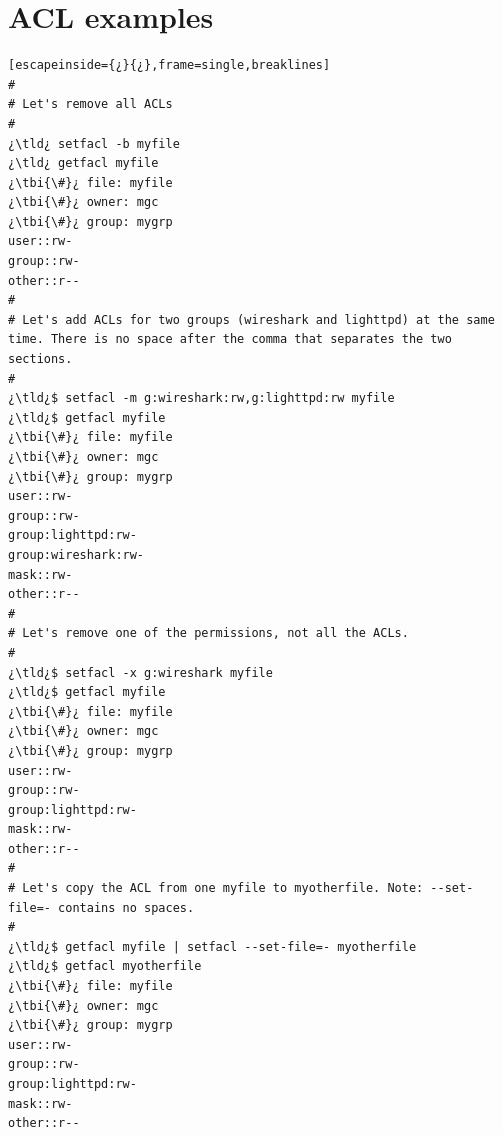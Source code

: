 \section{ACL examples}

\begin{lstlisting}[escapeinside={¿}{¿},frame=single,breaklines]
#
# Let's remove all ACLs	
#
¿\tld¿ setfacl -b myfile
¿\tld¿ getfacl myfile
¿\tbi{\#}¿ file: myfile
¿\tbi{\#}¿ owner: mgc
¿\tbi{\#}¿ group: mygrp
user::rw-
group::rw-
other::r--	
#
# Let's add ACLs for two groups (wireshark and lighttpd) at the same time. There is no space after the comma that separates the two sections.
#
¿\tld¿$ setfacl -m g:wireshark:rw,g:lighttpd:rw myfile
¿\tld¿$ getfacl myfile
¿\tbi{\#}¿ file: myfile
¿\tbi{\#}¿ owner: mgc
¿\tbi{\#}¿ group: mygrp
user::rw-
group::rw-
group:lighttpd:rw-
group:wireshark:rw-
mask::rw-
other::r--	
#
# Let's remove one of the permissions, not all the ACLs.
#
¿\tld¿$ setfacl -x g:wireshark myfile
¿\tld¿$ getfacl myfile
¿\tbi{\#}¿ file: myfile
¿\tbi{\#}¿ owner: mgc
¿\tbi{\#}¿ group: mygrp
user::rw-
group::rw-
group:lighttpd:rw-
mask::rw-
other::r--	
#
# Let's copy the ACL from one myfile to myotherfile. Note: --set-file=- contains no spaces.
#
¿\tld¿$ getfacl myfile | setfacl --set-file=- myotherfile
¿\tld¿$ getfacl myotherfile
¿\tbi{\#}¿ file: myfile
¿\tbi{\#}¿ owner: mgc
¿\tbi{\#}¿ group: mygrp
user::rw-
group::rw-
group:lighttpd:rw-
mask::rw-
other::r--	
\end{lstlisting}




